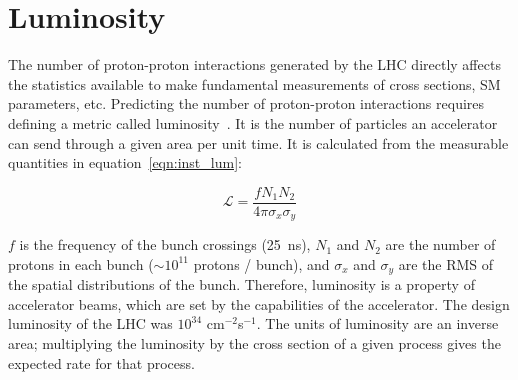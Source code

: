 
\section{Luminosity}

The number of proton-proton interactions generated by the LHC directly affects the statistics available to make fundamental measurements of cross sections, SM parameters, etc. 
Predicting the number of proton-proton interactions requires defining a metric called luminosity~\cite{zyla_review_2020}. It is the number of particles an accelerator can send through a given area per unit time. It is calculated from the measurable quantities in equation~\ref{eqn:inst_lum}:

\begin{equation}
\mathcal{L} = \frac{f N_{1} N_{2} }{4 \pi \sigma_{x} \sigma_{y}}
\label{eqn:inst_lum}
\end{equation}

$f$ is the frequency of the bunch crossings (\SI{25}{\nano\second}), $N_{1}$ and $N_{2}$ are the number of protons in each bunch ($\sim 10^{11}$ protons / bunch), and $\sigma_{x}$ and $\sigma_{y}$ are the RMS of the spatial distributions of the bunch. Therefore, luminosity is a property of accelerator beams, which are set by the capabilities of the accelerator. The design luminosity of the LHC was $10^{34}$ cm$^{-2}$s$^{-1}$. The units of luminosity are an inverse area; multiplying the luminosity by the cross section of a given process gives the expected rate for that process.

